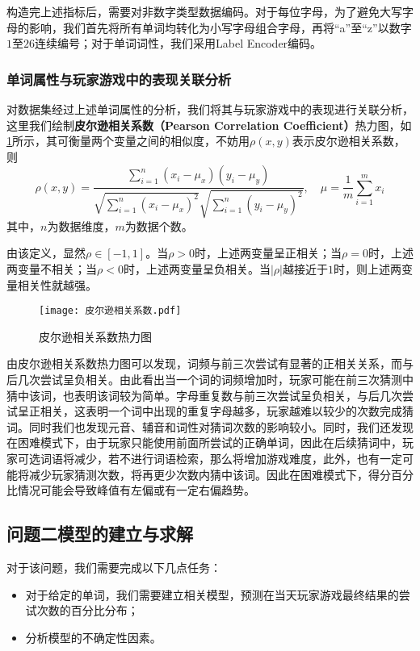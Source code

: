 \documentclass{MathModeling}
\begin{document}
	构造完上述指标后，需要对非数字类型数据编码。对于每位字母，为了避免大写字母的影响，我们首先将所有单词均转化为小写字母组合字母，再将“a”至“z”以数字$1$至$26$连续编号；对于单词词性，我们采用Label Encoder编码。
	\subsubsection{单词属性与玩家游戏中的表现关联分析}\label{单词属性与玩家游戏中的表现关联分析}
	对数据集经过上述单词属性的分析，我们将其与玩家游戏中的表现进行关联分析，这里我们绘制\textbf{皮尔逊相关系数（Pearson Correlation Coefficient）}热力图，如\textcolor{blue}{\cref{fig:皮尔逊相关系数热力图}}所示，其可衡量两个变量之间的相似度\textcolor{blue}{\cite{ppearson1}}，不妨用$\rho\left(x,y\right)$表示皮尔逊相关系数，则
	\begin{equation}
	\rho\left(x,y\right)=\frac{\sum\limits_{i=1}^{n}\left(x_{i}-\mu_x\right)\left(y_{i}-\mu_y\right)}{\sqrt{\sum\limits_{i=1}^{n}\left(x_{i}-\mu_x\right)^{2}}\sqrt{\sum\limits_{i=1}^{n}\left(y_{i}-\mu_y\right)^{2}}},\quad\mu=\frac{1}{m}\sum_{i=1}^{m}x_i \label{fpearson}
	\end{equation}
	其中，$n$为数据维度，$m$为数据个数。
	
	由该定义，显然$\rho\in[-1,1]$。当$\rho>0$时，上述两变量呈正相关；当$\rho=0$时，上述两变量不相关；当$\rho<0$时，上述两变量呈负相关。当$\left|\rho\right|$越接近于$1$时，则上述两变量相关性就越强\textcolor{blue}{\cite{ppearson2}}。
	\begin{figure}[H]
		\centering
		\texttt{[image: 皮尔逊相关系数.pdf]}
		\caption{皮尔逊相关系数热力图}
		\label{fig:皮尔逊相关系数热力图}
	\end{figure}

	由皮尔逊相关系数热力图可以发现，词频与前三次尝试有显著的正相关关系，而与后几次尝试呈负相关。由此看出当一个词的词频增加时，玩家可能在前三次猜测中猜中该词，也表明该词较为简单。字母重复数与前三次尝试呈负相关，与后几次尝试呈正相关，这表明一个词中出现的重复字母越多，玩家越难以较少的次数完成猜词。同时我们也发现元音、辅音和词性对猜词次数的影响较小。同时，我们还发现在困难模式下，由于玩家只能使用前面所尝试的正确单词，因此在后续猜词中，玩家可选词语将减少，若不进行词语检索，那么将增加游戏难度，此外，也有一定可能将减少玩家猜测次数，将再更少次数内猜中该词。因此在困难模式下，得分百分比情况可能会导致峰值有左偏或有一定右偏趋势。

	\subsection{问题二模型的建立与求解}
	对于该问题，我们需要完成以下几点任务：
	\begin{itemize}
		\item 对于给定的单词，我们需要建立相关模型，预测在当天玩家游戏最终结果的尝试次数的百分比分布；
		\item 分析模型的不确定性因素。
	\end{itemize}
	
\end{document}
